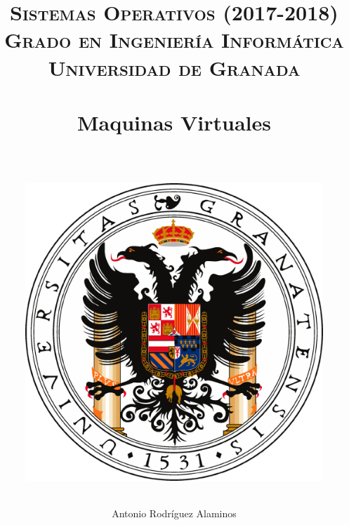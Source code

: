 


\title{	
	\normalfont \normalsize 
	\textsc{\textbf{Sistemas Operativos (2017-2018)} \\ Grado en Ingeniería Informática \\ Universidad de Granada} \\ [25pt] %
	\horrule{0.5pt} \\[0.4cm] %
	\huge Maquinas Virtuales \\ %
	\horrule{2pt} \\[0.5cm] %
	\begin{figure}[H] %
		\centering
		\includegraphics[scale=0.5]{image/ugr.png}  %
	\end{figure}
}

\author{Antonio Rodríguez Alaminos} %

